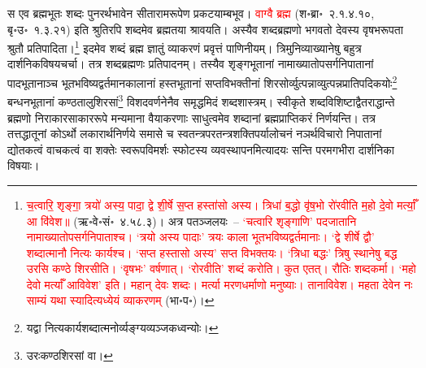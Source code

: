 \begin{sloppypar}\justifying\noindent स एव ब्रह्मभूतः शब्दः पुनरर्थभावेन सीता\-राम\-रूपेण प्रकटयाम्बभूव। \textcolor{red}{वाग्वै ब्रह्म} (श॰ब्रा॰~२.१.४.१०, बृ॰उ॰~१.३.२१) इति श्रुतिरपि शब्दमेव ब्रह्मतया श्रावयति। अस्यैव शब्द\-ब्रह्मणो भगवतो देवस्य वृषभ\-रूपता श्रुतौ प्रतिपादिता।\footnote{\textcolor{red}{च॒त्वारि॒ शृङ्गा॒ त्रयो॑ अस्य॒ पादा॒ द्वे शी॒र्षे स॒प्त हस्ता॑सो अस्य। त्रिधा॑ ब॒द्धो वृ॑ष॒भो रो॑रवीति म॒हो दे॒वो मर्त्याँ॒ आ वि॑वेश॥} (ऋ॰वे॰सं॰~४.५८.३)। अत्र पतञ्जलयः~– \textcolor{red}{‘चत्वारि शृङ्गाणि’ पदजातानि नामाख्यातोप\-सर्गनिपाताश्च। ‘त्रयो अस्य पादाः’ त्रयः काला भूतभविष्यद्वर्तमानाः। ‘द्वे शीर्षे द्वौ’ शब्दात्मानौ नित्यः कार्यश्च। ‘सप्त हस्तासो अस्य’ सप्त विभक्तयः। ‘त्रिधा बद्धः’ त्रिषु स्थानेषु बद्ध उरसि कण्ठे शिरसीति। ‘वृषभः’ वर्षणात्। ‘रोरवीति’ शब्दं करोति। कुत एतत्। रौतिः शब्दकर्मा। ‘महो देवो मर्त्याँ आविवेश’ इति। महान् देवः शब्दः। मर्त्या मरणधर्माणो मनुष्याः। तानाविवेश। महता देवेन नः साम्यं यथा स्यादित्यध्येयं व्याकरणम्} (भा॰प॰)।} इदमेव शब्दं ब्रह्म ज्ञातुं व्याकरणं प्रवृत्तं पाणिनीयम्। त्रिमुनि\-व्याख्यानेषु बहुत्र
दार्शनिक\-विषय\-चर्चा। तत्र शब्द\-ब्रह्मणः प्रतिपादनम्। तस्यैव शृङ्ग\-भूतानां नामाख्यातोपसर्ग\-निपातानां पाद\-भूतानाञ्च भूत\-भविष्यद्वर्तमान\-कालानां हस्त\-भूतानां सप्त\-विभक्तीनां शिरसोर्व्युत्पन्नाव्युत्पन्न\-प्रातिपदिकयोः\footnote{यद्वा नित्यकार्य\-शब्दात्मनोर्व्यङ्ग्य\-व्यञ्जक\-ध्वन्योः।} बन्धन\-भूतानां कण्ठ\-तालु\-शिरसां\footnote{उरःकण्ठशिरसां वा।} विशद\-वर्णनेनैव समृद्धमिदं शब्द\-शास्त्रम्। स्वीकृते शब्द\-विशिष्टाद्वैत\-राद्धान्ते ब्रह्मणो निराकार\-साकार\-रूपे मन्यमाना वैयाकरणाः साधुत्वमेव शब्दानां ब्रह्म\-प्राप्ति\-करं निर्णयन्ति। तत्र तत्तद्धातूनां कोऽर्थो लकारार्थ\-निर्णये समासे च स्वतन्त्र\-परतन्त्र\-शक्ति\-पर्यालोचनं नञर्थ\-विचारो निपातानां द्योतकत्वं वाचकत्वं वा शक्तेः स्वरूप\-विमर्शः स्फोटस्य व्यवस्थापनमित्यादयः सन्ति परम\-गभीरा दार्शनिका विषयाः।\end{sloppypar}
